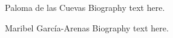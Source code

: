 \documentclass[journal,transmag]{IEEEtran}
\begin{document}
% 

\begin{IEEEbiographynophoto}{Paloma de las Cuevas}
Biography text here.
\end{IEEEbiographynophoto}

\begin{IEEEbiographynophoto}{Maribel Garc\'{i}a-Arenas}
Biography text here.
\end{IEEEbiographynophoto}






\end{document}
